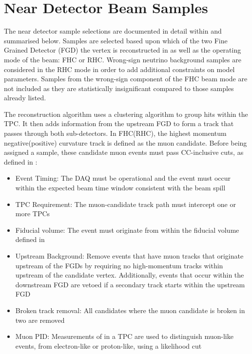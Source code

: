 \clearpage
\section{Near Detector Beam Samples}
\label{sec:SelsAndSysts_Sels_ND}

The near detector sample selections are documented in detail within \cite{t2k_tn_395} and summarised below. Samples are selected based upon which of the two Fine Grained Detector (FGD) the vertex is reconstructed in as well as the operating mode of the beam: FHC or RHC. Wrong-sign neutrino background samples are considered in the RHC mode in order to add additional constraints on model parameters. Samples from the wrong-sign component of the FHC beam mode are not included as they are statistically insignificant compared to those samples already listed.

The reconstruction algorithm uses a clustering algorithm to group hits within the TPC. It then adds information from the upstream FGD to form a track that passes through both sub-detectors. In FHC(RHC), the highest momentum negative(positive) curvature track is defined as the muon candidate. Before being assigned a sample, these candidate muon events must pass CC-inclusive cuts, as defined in \cite{t2k_tn_212}:

\begin{itemize}
\item Event Timing: The DAQ must be operational and the event must occur within the expected beam time window consistent with the beam spill
\item TPC Requirement: The muon-candidate track path must intercept one or more TPCs
\item Fiducial volume: The event must originate from within the fiducial volume defined in \cite{thesis_will}
\item Upstream Background: Remove events that have muon tracks that originate upstream of the FGDs by requiring no high-momentum tracks within  upstream of the candidate vertex. Additionally, events that occur within the downstream FGD are vetoed if a secondary track starts within the upstream FGD
\item Broken track removal: All candidates where the muon candidate is broken in two are removed
\item Muon PID: Measurements of  in a TPC are used to distinguish muon-like events, from electron-like or proton-like, using a likelihood cut
\end{itemize}

